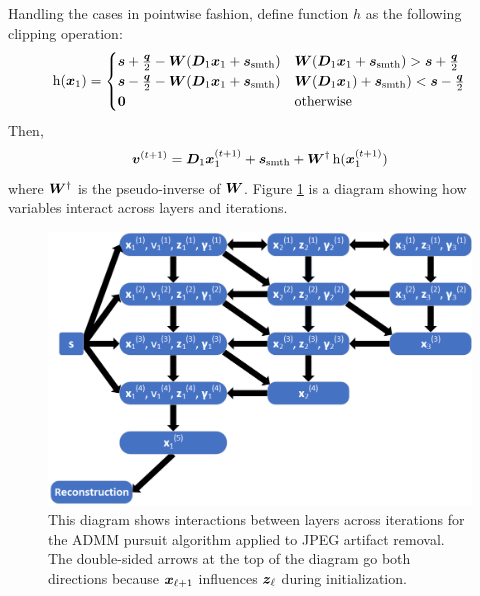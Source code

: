 Handling the cases in pointwise fashion, define function $h$ as the following clipping operation:
%
\begin{equation}
\operatorname{h}(\bm{x}_1) = \begin{cases} \bm{s} + \frac{\bm{q}}{2} - \bm{W}(\bm{D}_1\bm{x}_1 + \bm{s}_{\textrm{smth}}) & \bm{W}(\bm{D}_1\bm{x}_1 + \bm{s}_{\textrm{smth}}) > \bm{s} + \frac{\bm{q}}{2} \\ \bm{s} - \frac{\bm{q}}{2} - \bm{W}(\bm{D}_1\bm{x}_1 + \bm{s}_{\textrm{smth}}) & \bm{W}(\bm{D}_1\bm{x}_1) + \bm{s}_{\textrm{smth}}) < \bm{s} - \frac{\bm{q}}{2} \\ \bm{0} & \text{otherwise}
\end{cases}
\end{equation}
%
Then,
\begin{equation}
\bm{v}^{(t + 1)} = \bm{D}_1\bm{x}_1^{(t + 1)} + \bm{s}_{\text{smth}} + \bm{W}^{\dagger}\operatorname{h}(\bm{x}_1^{(t + 1)})
\end{equation}
where $\bm{W}^{\dagger}$ is the pseudo-inverse of $\bm{W}$. Figure \ref{figure:ADMM Multi-Layer JPEG Diagram} is a diagram showing how variables interact across layers and iterations.
\begin{figure}
	\includegraphics[width=\textwidth]{figures/multi-layer_ADMM-node-dependencies-JPEG.png}
	\caption{This diagram shows interactions between layers across iterations for the ADMM pursuit algorithm applied to JPEG artifact removal. The double-sided arrows at the top of the diagram go both directions because $\bm{x}_{\ell + 1}$ influences $\bm{z}_{\ell}$ during initialization.}
	\label{figure:ADMM Multi-Layer JPEG Diagram}
\end{figure}

